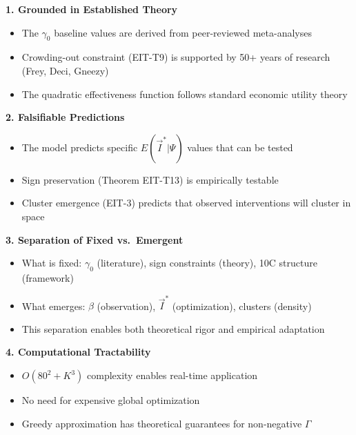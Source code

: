 \begin{tcolorbox}[colback=gray!5!white, colframe=gray!75!black,
    title=\textbf{Why This Approach Is Scientifically Valid}]

\textbf{1. Grounded in Established Theory}
\begin{itemize}[nosep]
    \item The $\gamma_0$ baseline values are derived from peer-reviewed meta-analyses
    \item Crowding-out constraint (EIT-T9) is supported by 50+ years of research (Frey, Deci, Gneezy)
    \item The quadratic effectiveness function follows standard economic utility theory
\end{itemize}

\textbf{2. Falsifiable Predictions}
\begin{itemize}[nosep]
    \item The model predicts specific $E(\vec{I}^* | \Psi)$ values that can be tested
    \item Sign preservation (Theorem EIT-T13) is empirically testable
    \item Cluster emergence (EIT-3) predicts that observed interventions will cluster in space
\end{itemize}

\textbf{3. Separation of Fixed vs.\ Emergent}
\begin{itemize}[nosep]
    \item What is fixed: $\gamma_0$ (literature), sign constraints (theory), 10C structure (framework)
    \item What emerges: $\beta$ (observation), $\vec{I}^*$ (optimization), clusters (density)
    \item This separation enables both theoretical rigor and empirical adaptation
\end{itemize}

\textbf{4. Computational Tractability}
\begin{itemize}[nosep]
    \item $O(80^2 + K^3)$ complexity enables real-time application
    \item No need for expensive global optimization
    \item Greedy approximation has theoretical guarantees for non-negative $\Gamma$
\end{itemize}

\end{tcolorbox}


